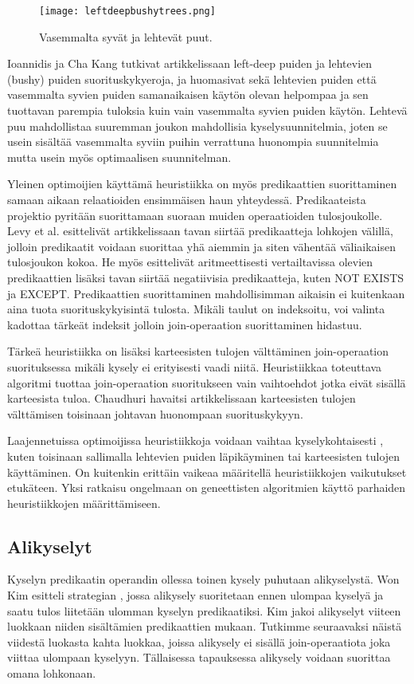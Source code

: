 \documentclass[finnish]{tktltiki2}
\theoremstyle{definition}
\theoremstyle{remark}
\begin{document}
\begin{figure}[!h]
  \caption{Vasemmalta syvät ja lehtevät puut.}
  \centering
    \texttt{[image: leftdeepbushytrees.png]}
\end{figure}

Ioannidis ja Cha Kang tutkivat artikkelissaan \cite{ioannidis1991left} left-deep puiden ja lehtevien (bushy) puiden suorituskykyeroja, ja huomasivat sekä lehtevien puiden että vasemmalta syvien puiden samanaikaisen käytön olevan helpompaa ja sen tuottavan parempia tuloksia kuin vain vasemmalta syvien puiden käytön. Lehtevä puu mahdollistaa suuremman joukon mahdollisia kyselysuunnitelmia, joten se usein sisältää vasemmalta syviin puihin verrattuna huonompia suunnitelmia mutta usein myös optimaalisen suunnitelman.

Yleinen optimoijien käyttämä heuristiikka on myös predikaattien suorittaminen samaan aikaan relaatioiden ensimmäisen haun yhteydessä. Predikaateista projektio pyritään suorittamaan suoraan muiden operaatioiden tulosjoukolle. Levy et al. esittelivät artikkelissaan \cite{levy1994query} tavan siirtää predikaatteja lohkojen välillä, jolloin predikaatit voidaan suorittaa yhä aiemmin ja siten vähentää väliaikaisen tulosjoukon kokoa. He myös esittelivät aritmeettisesti vertailtavissa olevien predikaattien lisäksi tavan siirtää negatiivisia predikaatteja, kuten NOT EXISTS ja EXCEPT. Predikaattien suorittaminen mahdollisimman aikaisin ei kuitenkaan aina tuota suorituskykyisintä tulosta. \cite{ramakrishnan2003database} Mikäli taulut on indeksoitu, voi valinta kadottaa tärkeät indeksit jolloin join-operaation suorittaminen hidastuu.

Tärkeä heuristiikka on lisäksi karteesisten tulojen välttäminen join-operaation suorituksessa mikäli kysely ei erityisesti vaadi niitä. Heuristiikkaa toteuttava algoritmi tuottaa join-operaation suoritukseen vain vaihtoehdot jotka eivät sisällä karteesista tuloa. Chaudhuri havaitsi artikkelissaan \cite{chaudhuri1998} karteesisten tulojen välttämisen toisinaan johtavan huonompaan suorituskykyyn. 

Laajennetuissa optimoijissa heuristiikkoja voidaan vaihtaa kyselykohtaisesti \cite{chaudhuri1998}, kuten toisinaan sallimalla lehtevien puiden läpikäyminen tai karteesisten tulojen käyttäminen. On kuitenkin erittäin vaikeaa määritellä heuristiikkojen vaikutukset etukäteen. Yksi ratkaisu ongelmaan on geneettisten algoritmien \cite{bennett1991genetic} käyttö parhaiden heuristiikkojen määrittämiseen.
\subsection{Alikyselyt}
Kyselyn predikaatin operandin ollessa toinen kysely puhutaan alikyselystä. Won Kim esitteli strategian \cite{kim1982optimizing}, jossa alikysely suoritetaan ennen ulompaa kyselyä ja saatu tulos liitetään ulomman kyselyn predikaatiksi. Kim jakoi alikyselyt viiteen luokkaan niiden sisältämien predikaattien mukaan. Tutkimme seuraavaksi näistä viidestä luokasta kahta luokkaa, joissa alikysely ei sisällä join-operaatiota joka viittaa ulompaan kyselyyn. Tällaisessa tapauksessa alikysely voidaan suorittaa omana lohkonaan. 
\newline
\end{document}
